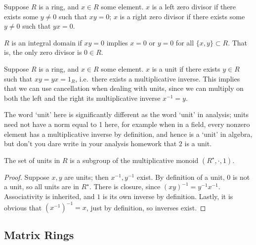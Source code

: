 \begin{definition}
    Suppose \(R\) is a ring, and \(x \in R\) some element.
    \(x\) is a left zero divisor if there exists some \(y \neq 0\)
    such that \(xy = 0\);
    \(x\) is a right zero divisor if there exists some \(y \neq 0\)
    such that \(yx = 0\).
\end{definition}
\begin{definition}
    \(R\) is an integral domain if \(xy = 0\)
    implies \(x = 0\) or \(y = 0\) for all \(\{x,y\} \subset R\).
    That is, the only zero divisor is \(0 \in R\).
\end{definition}

\begin{definition}
    Suppose \(R\) is a ring, and \(x \in R\) some element.
    \(x\) is a unit if there exists \(y \in R\)
    such that \(xy = yx = 1_R\),
    i.e.\ there exists a multiplicative inverse.
    This implies that we can use cancellation when dealing with units,
    since we can multiply on both the left and the right
    its multiplicative inverse \(x^{-1} = y\).
\end{definition}
\begin{remark}
    The word `unit' here is significantly different
    as the word `unit' in analysis;
    units need not have a norm equal to 1 here,
    for example when in a field,
    every nonzero element has a multiplicative inverse by definition,
    and hence is a `unit' in algebra,
    but don't you dare write in your analysis homework
    that \(2\) is a unit.
\end{remark}
\begin{proposition}
    The set of units in \(R\) is a subgroup
    of the multiplicative monoid \((R^\star,\cdot,1)\).
\end{proposition}
\begin{proof}
    Suppose \(x,y\) are units; then \(x^{-1},y^{-1}\) exist.
    By definition of a unit, \(0\) is not a unit,
    so all units are in \(R^\star\).
    There is closure, since \({(xy)}^{-1} = y^{-1}x^{-1}\).
    Associativity is inherited,
    and \(1\) is its own inverse by definition.
    Lastly, it is obvious that \({(x^{-1})}^{-1} = x\),
    just by definition, so inverses exist.
\end{proof}


\subsection{Matrix Rings}\label{sec:matrix-rings}

